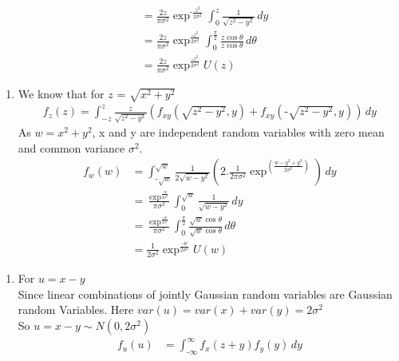 \documentclass{beamer}
\newcounter{currentenumi}
\begin{document}
\begin{frame}
\begin{align}
&=\frac{2z}{\pi \sigma^2} \exp^{\text{-}\frac{z^2}{2\sigma^2}} \int_0^z \frac{1}{\sqrt{z^2-y^2}} \,dy\\
&=\frac{2z}{\pi \sigma^2} \exp^{\frac{\text{-}z^2}{2 \sigma^2}} \int_0^{\frac{\pi}{2}} \frac{z \cos \theta}{z \cos \theta} \,d\theta\\
&=\frac{2z}{\pi \sigma^2} \exp^{\frac{\text{-}z^2}{2 \sigma^2}}U(z)
\end{align}
\end{frame}

\begin{frame}
\begin{enumerate}
\setcounter{enumi}{\thecurrentenumi}
\item We know that for $z$ = $\sqrt{x^{2}+y^{2}}$
\begin{align}
f_z(z)= \int_{-z}^{z} \frac{z}{\sqrt{z^{2}-y^{2}}} \left(f_{xy}(\sqrt{z^{2}-y^{2}},y)+f_{xy}(\text{-}\sqrt{z^{2}-y^{2}},y)\right) \,dy
\end{align}
As $w = x^2 + y^2$, x and y are independent random variables with zero mean and common variance $\sigma^{2}$.
\begin{align}
f_w(w)&= \int_{\text{-}\sqrt{w}}^{\sqrt{w}} \frac{1}{2 \sqrt{w-y^2}} \left(2.\frac{1}{2 \pi \sigma^{2}} \exp^{(\frac{w-y^{2}+y^{2}}{2 \sigma^{2}})}\right) \,dy\\
&=\frac{\exp^{\frac{\text{-}w}{2\sigma^{2}}}}{\pi \sigma^{2}} \int_{0}^{\sqrt{w}}\frac{1}{\sqrt{w-y^{2}}} \,dy\\
&=\frac{\exp^{\frac{\text{-}w}{2\sigma^{2}}}}{\pi \sigma^{2}} \int_{0}^{\frac{\pi}{2}} \frac{\sqrt{w}\cos \theta}{\sqrt{w}\cos \theta} \,d\theta\\
&=\frac{1}{2 \sigma^{2}} \exp^{\frac{\text{-}w}{2 \sigma^{2}}} U(w)
\end{align}
\setcounter{currentenumi}{\theenumi}
\end{enumerate}
\end{frame}

\begin{frame}
\begin{enumerate}
\setcounter{enumi}{\thecurrentenumi}
\item For $u = x-y$\\
Since linear combinations of jointly Gaussian random variables are Gaussian random Variables. Here $var(u)= var(x) + var(y) = 2\sigma^2$\\
So $u = x-y \sim N(0,2\sigma^2)$\\
\begin{align}
f_u(u)&= \int_{\text{-} \infty}^{\infty} f_x(z+y)f_y(y)\,dy
\end{align}
\end{enumerate}
\end{frame}
\end{document}
